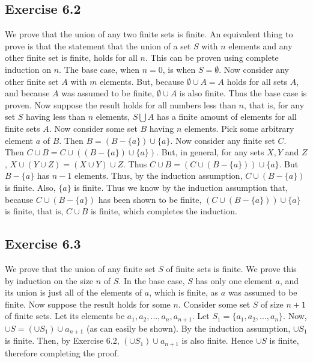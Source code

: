 \documentclass{article}
\theoremstyle{definition}
\begin{document}
\subsection*{Exercise 6.2}
We prove that the union of any two finite sets is finite. An equivalent thing to prove is that the statement that the 
union of a set $S$ with $n$ elements and any other finite set is finite, 
holds for all $n$. This can be proven using complete induction on $n$. The base case, when $n=0$, is when $S=\emptyset$. Now consider any other finite set $A$ with $m$ elements. 
But, because $\emptyset\cup A=A$ holds for all sets $A$, and because $A$ was assumed to be finite, $\emptyset\cup A$ is also finite. Thus the base case is proven. Now 
suppose the result holds for all numbers less than $n$, that is, for any set $S$ having less than $n$ elements, 
$S\bigcup A$ has a finite amount of elements for all finite sets $A$. Now consider some set $B$ having $n$ elements. Pick some arbitrary element $a$ of $B$. Then 
$B=(B-\{a\})\cup\{a\}$. Now consider any finite set $C$. Then $C\cup B=C\cup ((B-\{a\})\cup\{a\})$. But, in general, for any sets $X,Y$ and $Z$, 
$X\cup (Y\cup Z)=(X\cup Y)\cup Z$. Thus $C\cup B=(C\cup (B-\{a\}))\cup\{a\}$. But 
$B-\{a\}$ has $n-1$ elements. Thus, by the induction assumption, $C\cup (B-\{a\})$ is finite. Also, $\{a\}$ is finite. Thus we know by the induction assumption that, because 
$C\cup (B-\{a\})$ has been shown to be finite, $(C\cup (B-\{a\}))\cup\{a\}$ is finite, that is, $C\cup B$ is finite, which completes the induction.

\subsection*{Exercise 6.3}
We prove that the union of any finite set $S$ of finite sets is finite. We prove this by induction on the size $n$ of $S$. In the base case, $S$ has only one element $a$, 
and its union is just all of the elements of $a$, which is finite, as $a$ was assumed to be finite. Now suppose the result holds for some $n$. Consider some set $S$ of 
size $n+1$ of finite sets. Let its elements be $a_1,a_2,...,a_n,a_{n+1}$. Let $S_1=\{a_1,a_2,...,a_n\}$. Now, 
$\cup S=(\cup S_1)\cup a_{n+1}$ (as can easily be shown). By the induction assumption, $\cup S_1$ is finite. Then, by Exercise 6.2, 
$(\cup S_1)\cup a_{n+1}$ is also finite. Hence $\cup S$ is finite, therefore completing the proof.
\end{document}
